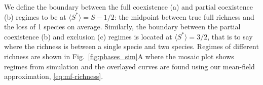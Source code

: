 \documentclass[9pt,twocolumn,twoside,lineno]{pnas-new}
\begin{document}
\iffalse
\begin{center}
\begin{tabular}{lccc}
\hline
\multirow{2}{4em}{\textcolor{black}{modality:}} & &
      \textcolor{black}{$R_n(\tilde{x} \rightarrow \tilde{x} +1)=R_n(\tilde{x}+1 \rightarrow \tilde{x})$} \\ &
     & \textcolor{black}{$R_n(0 \rightarrow 1)=R_n(1 \rightarrow 0)$}   \\
    \hline 
    \multirow{2}{4em}{\textcolor{black}{richness:}}  & & \textcolor{black}{$R_{S^*}(1 \rightarrow 2)=R_{S^*}(2 \rightarrow 1)$} \\ &
     & \textcolor{black}{$R_{S^*}(S \rightarrow S-1)=R_{S^*}(S-1 \rightarrow S)$}
\\
\hline
\end{tabular}    
\end{center}

\fi

We define the boundary between the full coexistence (a) and partial coexistence (b) regimes to be at $\langle S^* \rangle=S-1/2$: the midpoint between true full richness and the loss of 1 species on average.
Similarly, the boundary between the partial coexistence (b) and exclusion (c) regimes is located at $\langle S^* \rangle=3/2$, that is to say where the richness is between a single specie and two species.
Regimes of different richness are shown in Fig.~\ref{fig:phases_sim}A where the mosaic plot shows regimes from simulation and the overlayed curves are found using our mean-field approximation, \eqref{eq:mf-richness}.
\end{document}
